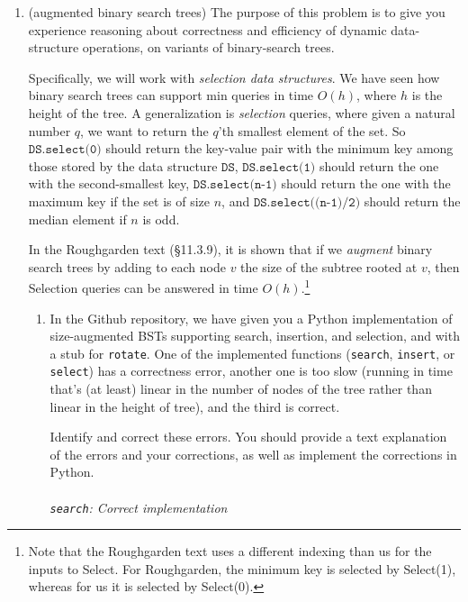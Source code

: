 \documentclass[11pt]{article}
\begin{document}
\begin{enumerate}
    \item (augmented binary search trees) The purpose of this problem is to give you experience reasoning about correctness and efficiency of dynamic data-structure operations, on variants of binary-search trees. 
    
    Specifically, we will work with {\em selection data structures}.
    We have seen how binary search trees can support min queries in time $O(h)$, where $h$ is the height of the tree.  A generalization is {\em selection} queries, where given a natural number $q$, we want to return the $q$'th smallest element of the set.  So $\texttt{DS.select(0)}$ should return the key-value pair with the minimum key among those stored by the data structure $\texttt{DS}$, $\texttt{DS.select(1)}$ should return the one with the second-smallest key, $\texttt{DS.select(n-1)}$ should return the one with the maximum key if the set is of size $n$, and $\texttt{DS.select((n-1)/2)}$ should return the median element if $n$ is odd.
    
    In the Roughgarden text (\S11.3.9), it is shown that if we {\em augment} binary search trees by adding to each node $v$ the size of the subtree rooted at $v$, then Selection queries can be answered in time $O(h)$.\footnote{Note that the Roughgarden text uses a different indexing than us for the inputs to Select. For Roughgarden, the minimum key is selected by Select(1), whereas for us it is selected by Select(0).}
    
    \begin{enumerate}
        \item In the Github repository, we have given you a Python implementation of size-augmented BSTs supporting search, insertion, and selection, and with a stub for \texttt{rotate}. One of the implemented functions (\texttt{search}, \texttt{insert}, or \texttt{select}) has a correctness error, another one is too slow (running in time that's (at least) linear in the number of nodes of the tree rather than linear in the height of tree), and the third is correct. 

        Identify and correct these errors. You should provide a text explanation of the errors and your corrections, as well as implement the corrections in Python.
       \\\\\textit{\texttt{search}: Correct implementation}
        

\end{enumerate}
\end{enumerate}
\end{document}
